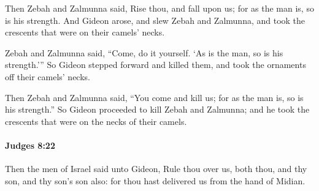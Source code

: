 			\begin{versebox}
					\item[BHS] 
					\item[ASV] Then Zebah and Zalmunna said, Rise thou, and fall upon us; for as the man is, so is his strength. And Gideon arose, and slew Zebah and Zalmunna, and took the crescents that were on their camels' necks.
					\item[NIV] Zebah and Zalmunna said, “Come, do it yourself. ‘As is the man, so is his strength.’” So Gideon stepped forward and killed them, and took the ornaments off their camels’ necks.
					\item[NRSV] Then Zebah and Zalmunna said, “You come and kill us; for as the man is, so is his strength.” So Gideon proceeded to kill Zebah and Zalmunna; and he took the crescents that were on the necks of their camels.
			\end{versebox}

		\paragraph{Judges 8:22} %
			\label{JUDGES-8-22}

			Then the men of Israel said unto Gideon, Rule thou over us, both thou, and thy son, and thy son’s son also: for thou hast delivered us from the hand of Midian.

